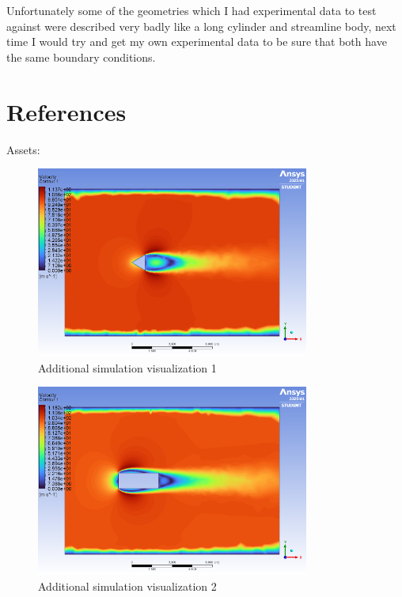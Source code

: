 \documentclass[12pt,a4paper]{article}
\begin{document}
Unfortunately some of the geometries which I had experimental data to test against were described very badly like a long cylinder and streamline body, next time I would try and get my own experimental data to be sure that both have the same boundary conditions.

\section{References}

\printbibliography[heading=none]

Assets:

\begin{figure}[H]
\centering
\includegraphics[width=0.8\textwidth]{image3.png}
\caption{Additional simulation visualization 1}
\label{fig:asset1}
\end{figure}

\begin{figure}[H]
\centering
\includegraphics[width=0.8\textwidth]{image10.png}
\caption{Additional simulation visualization 2}
\label{fig:asset2}
\end{figure}
\end{document}
